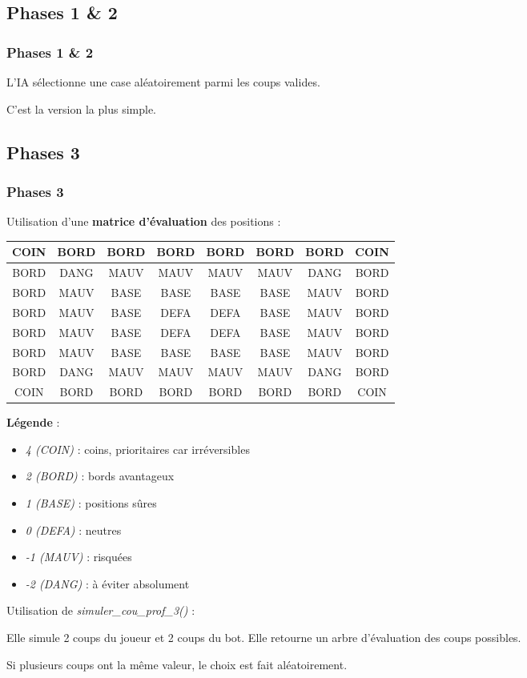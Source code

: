 \documentclass[9pt]{beamer}
\begin{document}
\subsection{Phases 1 \& 2}
\begin{frame}
  \frametitle{Phases 1 \& 2}
  L’IA sélectionne une case aléatoirement parmi les coups valides.

  C’est la version la plus simple.
\end{frame}

\subsection{Phases 3}
\begin{frame}
  \frametitle{Phases 3}
  Utilisation d’une \textbf{matrice d’évaluation} des positions :

  \begin{tabular}{|c|c|c|c|c|c|c|c|}
    \hline
    COIN & BORD & BORD & BORD & BORD & BORD & BORD & COIN \\
    \hline
    BORD & DANG & MAUV & MAUV & MAUV & MAUV & DANG & BORD \\
    \hline
    BORD & MAUV & BASE & BASE & BASE & BASE & MAUV & BORD \\
    \hline
    BORD & MAUV & BASE & DEFA & DEFA & BASE & MAUV & BORD \\
    \hline
    BORD & MAUV & BASE & DEFA & DEFA & BASE & MAUV & BORD \\
    \hline
    BORD & MAUV & BASE & BASE & BASE & BASE & MAUV & BORD \\
    \hline
    BORD & DANG & MAUV & MAUV & MAUV & MAUV & DANG & BORD \\
    \hline
    COIN & BORD & BORD & BORD & BORD & BORD & BORD & COIN \\
    \hline
  \end{tabular}
  \textbf{Légende} :
  \begin{itemize}
    \item \textit{4 (COIN)} : coins, prioritaires car irréversibles
    \item \textit{2 (BORD)} : bords avantageux
    \item \textit{1 (BASE)} : positions sûres
    \item \textit{0 (DEFA)} : neutres
    \item \textit{-1 (MAUV)} : risquées
    \item \textit{-2 (DANG)} : à éviter absolument
  \end{itemize}
  Utilisation de \textit{simuler\_cou\_prof\_3()} :

Elle simule 2 coups du joueur et 2 coups du bot. Elle retourne un arbre d’évaluation des coups possibles.

Si plusieurs coups ont la même valeur, le choix est fait aléatoirement.
\end{frame}
\end{document}
